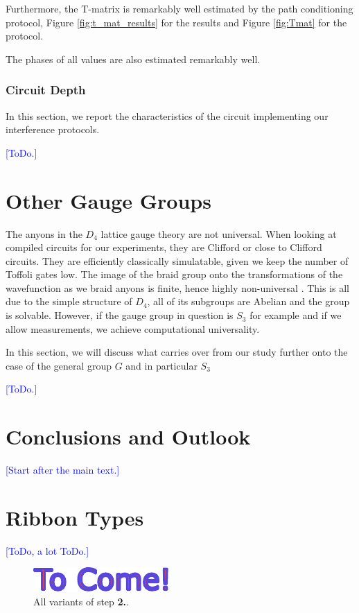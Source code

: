 \documentclass[two column]{article}
\newcommand{\jovan}[1]{\textcolor{blue}{[#1]}}
\begin{document}
Furthermore, the T-matrix is remarkably well estimated by the path conditioning protocol, Figure \ref{fig:t_mat_results} for the results and Figure \ref{fig:Tmat} for the protocol.

The phases of all values are also estimated remarkably well.

\subsubsection{Circuit Depth}

In this section, we report the characteristics of the circuit implementing our interference protocols.

\jovan{ToDo.}

\section{Other Gauge Groups}

The anyons in the $D_4$ lattice gauge theory are not universal. 
When looking at compiled circuits for our experiments, they are Clifford or close to Clifford circuits.
They are efficiently classically simulatable, given we keep the number of Toffoli gates low.
The image of the braid group onto the transformations of the wavefunction as we braid anyons is finite, hence highly non-universal \cite{}.
This is all due to the simple structure of $D_4$, all of its subgroups are Abelian and the group is solvable.
However, if the gauge group in question is $S_3$ for example and if we allow measurements, we achieve computational universality.

In this section, we will discuss what carries over from our study further onto the case of the general group $G$ and in particular $S_3$

\jovan{ToDo.}



\section{Conclusions and Outlook}

\jovan{Start after the main text.}

\appendix

\section{Ribbon Types}\label{app:ribs}
\jovan{ToDo, a lot ToDo.}

\begin{figure}
    \centering
    \includegraphics[width = 0.5\linewidth]{Figures/all_triangles.pdf}
    \caption{All variants of step \textbf{2.}.}
    \label{fig:all_triang}
\end{figure}
\end{document}

